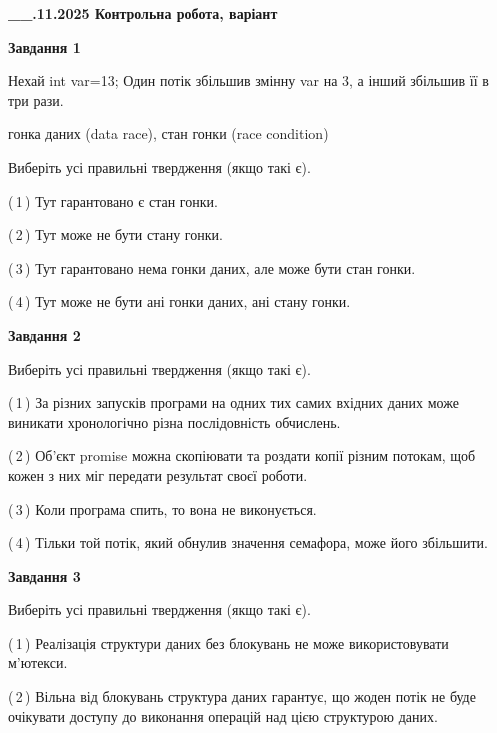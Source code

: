 \documentclass[12pt, ukrainian]{article}
\begin{document}
\begin {large}

\textbf{\_\_.11.2025 Контрольна робота, варіант  }\par


{

\begin{center}
\textbf{Завдання 1}
\end{center}
Нехай int var=13; Один потік збільшив змінну var на 3, а інший збільшив її в три рази.

гонка даних (data race), стан гонки (race condition)

Виберіть усі правильні твердження (якщо такі є).\par
\vspace{2mm}
(\,1\,) Тут гарантовано є стан гонки.%

(\,2\,) Тут може не бути стану гонки.%

(\,3\,) Тут гарантовано нема гонки даних, але може бути стан гонки.%

(\,4\,) Тут може не бути ані гонки даних, ані стану гонки.%



\begin{center}
\textbf{Завдання 2}
\end{center}
Виберіть усі правильні твердження (якщо такі є).\par
\vspace{2mm}

(\,1\,) За різних запусків програми на одних тих самих вхідних даних може виникати хронологічно різна послідовність обчислень.%

(\,2\,) Об’єкт promise можна скопіювати та роздати копії різним потокам, щоб кожен з них міг передати результат своєї роботи.%

(\,3\,) Коли програма спить, то вона не виконується.%

(\,4\,) Тільки той потік, який обнулив значення семафора, може його збільшити.%



\begin{center}
\textbf{Завдання 3}
\end{center}
Виберіть усі правильні твердження (якщо такі є).\par
\vspace{2mm}

(\,1\,) Реалізація структури даних без блокувань не може використовувати м’ютекси.%

(\,2\,) Вільна від блокувань структура даних гарантує, що жоден потік не буде очікувати доступу до виконання операцій над цією структурою даних.%

}
\end{large}
\end{document}
